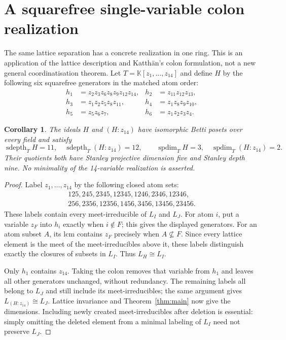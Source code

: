 \documentclass[11pt,a4paper]{article}
\newtheorem{corollary}[theorem]{Corollary}
\theoremstyle{remark}\newtheorem{remark}[theorem]{Remark}
\DeclareMathOperator{\sdepth}{sdepth}
\DeclareMathOperator{\spdim}{spdim}
\newcommand{\K}{\mathbb K}
\begin{document}
\section{A squarefree single-variable colon realization}\label{sec:colon}
The same lattice separation has a concrete realization in one ring. This is an application of the lattice description and Katth\"an's colon formulation, not a new general coordinatisation theorem.
Let $T=\K[z_1,\ldots,z_{14}]$ and define $H$ by the following six squarefree generators in the matched atom order:
\begin{align*}
h_1&=z_2z_3z_6z_8z_9z_{12}z_{14},&h_2&=z_{11}z_{12}z_{13},\\
h_3&=z_1z_2z_5z_8z_{11},&h_4&=z_1z_8z_9z_{10},\\
h_5&=z_5z_6z_7,&h_6&=z_1z_2z_3z_4.
\end{align*}
\begin{corollary}\label{cor:colon}
The ideals $H$ and $(H:z_{14})$ have isomorphic Betti posets over every field and satisfy
\[
\sdepth_T H=11,\quad \sdepth_T(H:z_{14})=12,
\qquad \spdim_T H=3,\quad\spdim_T(H:z_{14})=2.
\]
Their quotients both have Stanley projective dimension five and Stanley depth nine. No minimality of the 14-variable realization is asserted.
\end{corollary}
\begin{proof}
Label $z_1,\ldots,z_{14}$ by the following closed atom sets:
\begin{equation}\label{eq:labels}
\begin{gathered}
125,245,2345,12345,1246,2346,12346,\\
256,2356,12356,1456,3456,13456,23456.
\end{gathered}
\end{equation}
These labels contain every meet-irreducible of $L_I$ and $L_J$. For atom $i$, put a variable $z_F$ into $h_i$ exactly when $i\notin F$; this gives the displayed generators. For an atom subset $A$, its lcm contains $z_F$ precisely when $A\not\subseteq F$. Since every lattice element is the meet of the meet-irreducibles above it, these labels distinguish exactly the closures of subsets in $L_I$. Thus $L_H\cong L_I$.

Only $h_1$ contains $z_{14}$. Taking the colon removes that variable from $h_1$ and leaves all other generators unchanged, without redundancy. The remaining labels all belong to $L_J$ and still include its meet-irreducibles; the same argument gives $L_{(H:z_{14})}\cong L_J$. Lattice invariance and Theorem~\ref{thm:main} now give the dimensions. Including newly created meet-irreducibles after deletion is essential: simply omitting the deleted element from a minimal labeling of $L_I$ need not preserve $L_J$.
\end{proof}
\end{document}
